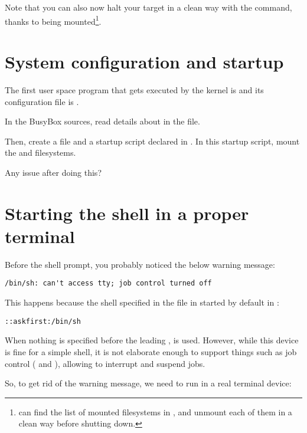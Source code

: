 Note that you can also now halt your target in a clean way with the 
command, thanks to  being mounted\footnote{
can find the list of mounted filesystems in , and
unmount each of them in a clean way before shutting down.}.

\section{System configuration and startup}

The first user space program that gets executed by the kernel is
 and its configuration file is .

In the BusyBox sources, read details about  in the
 file.

Then, create a  file and a 
startup script declared in . In this startup
script, mount the  and  filesystems.

Any issue after doing this?

\section{Starting the shell in a proper terminal}

Before the shell prompt, you probably noticed the below warning message:

\begin{verbatim}
/bin/sh: can't access tty; job control turned off
\end{verbatim}

This happens because the shell specified in the  file
in started by default in :

\begin{verbatim}
::askfirst:/bin/sh
\end{verbatim}

When nothing is specified before the leading \code{::}, 
is used. However, while this device is fine for a simple shell, it is
not elaborate enough to support things such as job control
(\code{[Ctrl][c]} and \code{[Ctrl][z]}), allowing to interrupt and
suspend jobs.

So, to get rid of the warning message, we need  to run
 in a real terminal device:


